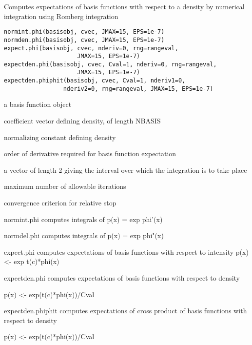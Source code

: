 \documentclass{article}
\begin{document}
\begin{Description}\relax
Computes expectations of basis functions with respect to a density
by numerical integration using Romberg integration
\end{Description}
\begin{Usage}
\begin{verbatim}
normint.phi(basisobj, cvec, JMAX=15, EPS=1e-7) 
normden.phi(basisobj, cvec, JMAX=15, EPS=1e-7) 
expect.phi(basisobj, cvec, nderiv=0, rng=rangeval,
                     JMAX=15, EPS=1e-7) 
expectden.phi(basisobj, cvec, Cval=1, nderiv=0, rng=rangeval,
                     JMAX=15, EPS=1e-7)
expectden.phiphit(basisobj, cvec, Cval=1, nderiv1=0,
                 nderiv2=0, rng=rangeval, JMAX=15, EPS=1e-7) 
\end{verbatim}
\end{Usage}
\begin{Arguments}
\begin{ldescription}
\item[\code{basisobj}] a basis function object 

\item[\code{cvec}] coefficient vector defining density, of length NBASIS 

\item[\code{Cval}] normalizing constant defining density 

\item[\code{nderiv, nderiv1, nderiv2}] order of derivative required for basis function expectation


\item[\code{rng}] a vector of length 2 giving the interval over which the integration is
to take place

\item[\code{JMAX}] maximum number of allowable iterations 

\item[\code{EPS}] convergence criterion for relative stop 

\end{ldescription}
\end{Arguments}
\begin{Details}\relax
normint.phi computes integrals of  
p(x) = exp phi'(x) 

normdel.phi computes integrals of
p(x) = exp phi"(x) 

expect.phi computes expectations of basis functions with respect to
intensity
p(x) <- exp t(c)*phi(x)


expectden.phi computes expectations of basis functions with respect
to density

p(x) <- exp(t(c)*phi(x))/Cval

expectden.phiphit computes expectations of cross product of basis
functions with respect to density

p(x) <- exp(t(c)*phi(x))/Cval
\end{Details}
\end{document}
